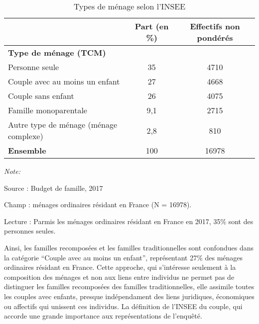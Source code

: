 \documentclass[
  12pt,
]{book}
\begin{document}
\begin{table}[!h]
\centering\centering
\caption{\label{tab:TYPMEN5}Types de ménage selon l'INSEE}
\centering
\fontsize{8}{10}\selectfont
\begin{threeparttable}
\begin{tabular}[t]{lcc}
\toprule
 & \textbf{Part (en \%)} & \textbf{Effectifs non pondérés}\\
\midrule
\textbf{Type de ménage (TCM)} &  & \\
\hspace{1em}Personne seule & 35 & 4710\\
\hspace{1em}Couple avec au moins un enfant & 27 & 4668\\
\hspace{1em}Couple sans enfant & 26 & 4075\\
\hspace{1em}Famille monoparentale & 9,1 & 2715\\
\addlinespace
\hspace{1em}Autre type de ménage (ménage complexe) & 2,8 & 810\\
\textbf{Ensemble} & 100 & 16978\\
\bottomrule
\end{tabular}
\begin{tablenotes}
\item \textit{Note: } 
\item Source : Budget de famille, 2017
\item Champ : ménages ordinaires résidant en France (N = 16978).
\item Lecture : Parmis les ménages ordinaires résidant en France en 2017, 35\% sont des personnes seules.
\end{tablenotes}
\end{threeparttable}
\end{table}

Ainsi, les familles recomposées et les familles traditionnelles sont
confondues dans la catégorie ``Couple avec au moins un enfant'',
représentant 27\% des ménages ordinaires résidant en France. Cette
approche, qui s'intéresse seulement à la composition des ménages et non
aux liens entre individus ne permet pas de distinguer les familles
recomposées des familles traditionnelles, elle assimile toutes les
couples avec enfants, presque indépendament des liens juridiques,
économiques ou affectifs qui unissent ces individus. La définition de
l'INSEE du couple, qui accorde une grande importance aux représentations
de l'enquêté.
\end{document}
